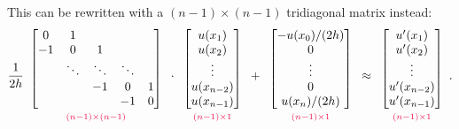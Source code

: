 \noindent This can be rewritten with a $(n-1)\times(n-1)$ tridiagonal matrix instead:
\begin{align}
\frac{1}{2h}
\begin{array}{c}
\begin{bmatrix}
0 & 1 & \\
-1 & 0 & 1  \\
& \ddots & \ddots & \ddots \\
& & -1 & 0 & 1 \\
& & & -1 & 0
\end{bmatrix}\\
{\scriptstyle\textcolor{red}{(n-1)\times(n-1)}}
\end{array}\cdot
\begin{array}{c}
\begin{bmatrix}
u(x_1) \\ u(x_2)\\ \vdots  \\ u(x_{n-2}) \\ u(x_{n-1})
\end{bmatrix}\\
{\scriptstyle\textcolor{red}{(n-1)\times1}}
\end{array} +
\begin{array}{c}
\begin{bmatrix}
-u(x_0)/(2h) \\ 0 \\ \vdots  \\ 0 \\ u(x_n)/(2h)
\end{bmatrix}\\
{\scriptstyle\textcolor{red}{(n-1)\times1}}
\end{array} \approx
\begin{array}{c}
\begin{bmatrix}
u'(x_1) \\ u'(x_2)\\ \vdots  \\ u'(x_{n-2}) \\ u'(x_{n-1})
\end{bmatrix}\\
{\scriptstyle\textcolor{red}{(n-1)\times1}}
\end{array}.
\label{finitedifference2:u}
\end{align}

